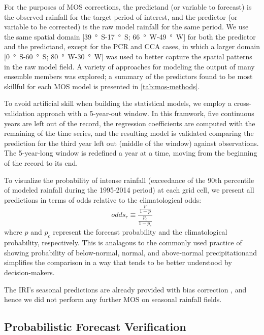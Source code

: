 \documentclass[twocol]{ametsoc}
\begin{document}
For the purposes of MOS corrections, the predictand (or variable to forecast) is the observed rainfall for the target period of interest, and the predictor (or variable to be corrected) is the raw model rainfall for the same period.
We use the same spatial domain [\SI{39}{\degree S}-\SI{17}{\degree S}; \SI{66}{\degree W}-\SI{49}{\degree W}] for both the predictor and the predictand, except for the PCR and CCA cases, in which a larger domain [\SI{0}{\degree S}-\SI{60}{\degree S}; \SI{80}{\degree W}-\SI{30}{\degree W}] was used to better capture the spatial patterns in the raw model field.
A variety of approaches for modeling the output of many ensemble members was explored; a summary of the predictors found to be most skillful for each MOS model is presented in \cref{tab:mos-methods}.

To avoid artificial skill when building the statistical models, we employ a cross-validation approach with a 5-year-out window.
In this framwork, five continuous years are left out of the record, the regression coefficients are computed with the remaining of the time series, and the resulting model is validated comparing the prediction for the third year left out (middle of the window) against observations.
The 5-year-long window is redefined a year at a time, moving from the beginning of the record to its end.

To visualize the probability of intense rainfall (exceedance of the 90th percentile of modeled rainfall during the 1995-2014 period) at each grid cell, we present all predictions in terms of odds relative to the climatological odds:
\begin{equation} \label{eq:odds-ratio}
odds_{r} \equiv \frac{\frac{p}{1-p}}{\frac{p_c}{1-p_c}}
\end{equation}
where $p$ and $p_c$ represent the forecast probability and the climatological probability, respectively.
This is analagous to the commonly used practice of showing probability of below-normal, normal, and above-normal precipitationand simplifies the comparison in a way that tends to be better understood by decision-makers.

The IRI's seasonal predictions are already provided with bias correction \citep{Barnston:2010ge}, and hence we did not perform any further MOS on seasonal rainfall fields.

\subsection{Probabilistic Forecast Verification}
\end{document}
